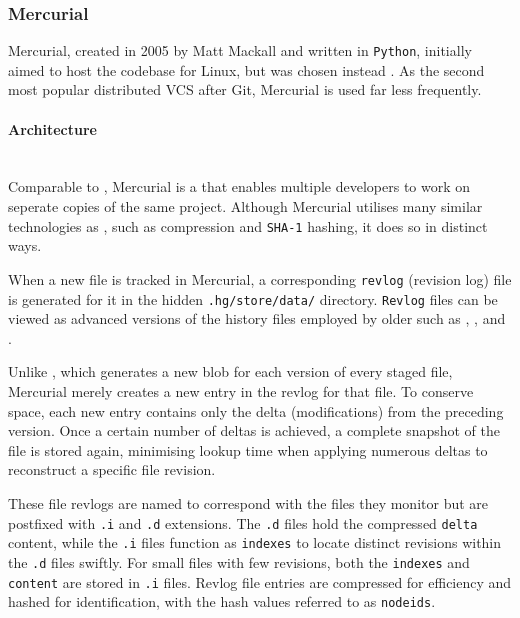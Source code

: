 \subsubsection{Mercurial}
\label{sec:mercurial}
Mercurial, created in 2005 by Matt Mackall and written in \lstinline{Python}, initially aimed to host the codebase for Linux, but  was chosen instead \cite{stopak_2019}. As the second most popular distributed VCS after Git, Mercurial is used far less frequently.
\paragraph{Architecture}
\hfill\medskip\\
Comparable to , Mercurial is a  that enables multiple developers to work on seperate copies of the same project. Although Mercurial utilises many similar technologies as , such as compression and \lstinline{SHA-1} hashing, it does so in distinct ways.
\smallskip

When a new file is tracked in Mercurial, a corresponding \lstinline{revlog} (revision log) file is generated for it in the hidden \lstinline{.hg/store/data/} directory. \lstinline{Revlog} files can be viewed as advanced versions of the history files employed by older  such as , , and .
\smallskip

Unlike , which generates a new blob for each version of every staged file, Mercurial merely creates a new entry in the revlog for that file. To conserve space, each new entry contains only the delta (modifications) from the preceding version. Once a certain number of deltas is achieved, a complete snapshot of the file is stored again, minimising lookup time when applying numerous deltas to reconstruct a specific file revision.
\smallskip

These file revlogs are named to correspond with the files they monitor but are postfixed with \lstinline{.i} and \lstinline{.d} extensions. The \lstinline{.d} files hold the compressed \lstinline{delta} content, while the \lstinline{.i} files function as \lstinline{indexes} to locate distinct revisions within the \lstinline{.d} files swiftly. For small files with few revisions, both the \lstinline{indexes} and \lstinline{content} are stored in \lstinline{.i} files. Revlog file entries are compressed for efficiency and hashed for identification, with the hash values referred to as \lstinline{nodeids}.

